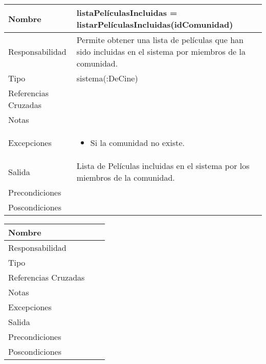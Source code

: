 \documentclass{article}
\begin{document}
\begin{table}[h]
\begin{tabular}{|l|l|l|l|l|l|}
\hline
\multicolumn{2}{|p{3cm}|}{Nombre} & \multicolumn{4}{p{10cm}|}{\textbf{listaPelículasIncluidas = listarPelículasIncluidas(idComunidad)}}\\
\hline
\multicolumn{2}{|p{3cm}|}{Responsabilidad} & \multicolumn{4}{p{10cm}|}{Permite obtener una lista de películas que han sido incluidas en el sistema por miembros de la comunidad.} \\
\hline
\multicolumn{2}{|p{3cm}|}{Tipo} & \multicolumn{4}{p{10cm}|}{sistema(:DeCine)} \\
\hline
\multicolumn{2}{|p{3cm}|}{Referencias Cruzadas} & \multicolumn{4}{p{10cm}|}{} \\
\hline
\multicolumn{2}{|p{3cm}|}{Notas} & \multicolumn{4}{p{10cm}|}{} \\
\hline
\multicolumn{2}{|p{3cm}|}{Excepciones} & \multicolumn{4}{p{10cm}|}{\begin{itemize}
\item Si la comunidad no existe.
\end{itemize}} \\
\hline
\multicolumn{2}{|p{3cm}|}{Salida} & \multicolumn{4}{p{10cm}|}{Lista de Películas incluidas en el sistema por los miembros de la comunidad.} \\
\hline
\multicolumn{2}{|p{3cm}|}{Precondiciones} & \multicolumn{4}{p{10cm}|}{} \\
\hline
\multicolumn{2}{|p{3cm}|}{Poscondiciones} & \multicolumn{4}{p{10cm}|}{} \\
\hline
\end{tabular}
\end{table}
\begin{table}[h]
\begin{tabular}{|l|l|l|l|l|l|}
\hline
\multicolumn{2}{|p{3cm}|}{Nombre} & \multicolumn{3}{p{10cm}|}{}\\
\hline
\multicolumn{2}{|p{3cm}|}{Responsabilidad} & \multicolumn{4}{p{10cm}|}{} \\
\hline
\multicolumn{2}{|p{3cm}|}{Tipo} & \multicolumn{4}{p{10cm}|}{} \\
\hline
\multicolumn{2}{|p{3cm}|}{Referencias Cruzadas} & \multicolumn{4}{p{10cm}|}{} \\
\hline
\multicolumn{2}{|p{3cm}|}{Notas} & \multicolumn{4}{p{10cm}|}{} \\
\hline
\multicolumn{2}{|p{3cm}|}{Excepciones} & \multicolumn{4}{p{10cm}|}{} \\
\hline
\multicolumn{2}{|p{3cm}|}{Salida} & \multicolumn{4}{p{10cm}|}{} \\
\hline
\multicolumn{2}{|p{3cm}|}{Precondiciones} & \multicolumn{4}{p{10cm}|}{} \\
\hline
\multicolumn{2}{|p{3cm}|}{Poscondiciones} & \multicolumn{4}{p{10cm}|}{} \\
\hline
\end{tabular}
\end{table}
	
\end{document}
